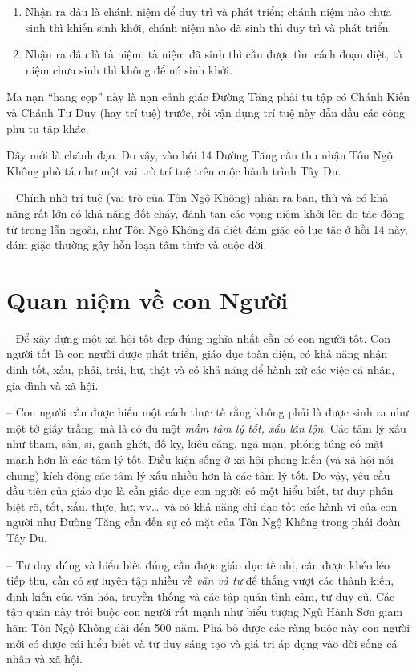 \begin{enumerate}[label=\itshape\arabic*\upshape/]
    \item Nhận ra đâu là chánh niệm để duy trì và phát triển; chánh niệm nào chưa sinh thì khiến sinh khởi, chánh niệm nào đã sinh thì duy trì và phát triển.

    \item Nhận ra đâu là tà niệm; tà niệm đã sinh thì cần được tìm cách đoạn diệt, tà niệm chưa sinh thì không để nó sinh khởi.
\end{enumerate}

Ma nạn ``hang cọp'' này là nạn cảnh giác Đường Tăng phải tu tập có Chánh Kiến và Chánh Tư Duy (hay trí tuệ) trước, rồi vận dụng trí tuệ này dẫn đầu các công phu tu tập khác.

Đây mới là chánh đạo. Do vậy, vào hồi 14 Đường Tăng cần thu nhận Tôn Ngộ Không phò tá như một vai trò trí tuệ trên cuộc hành trình Tây Du.

-- Chính nhờ trí tuệ (vai trò của Tôn Ngộ Không) nhận ra bạn, thù và có khả năng rất lớn có khả năng đốt cháy, đánh tan các vọng niệm khởi lên do tác động từ trong lẫn ngoài, như Tôn Ngộ Không đã diệt đám giặc cỏ lục tặc ở hồi 14 này, đám giặc thường gây hỗn loạn tâm thức và cuộc đời.

\section{Quan niệm về con Người} %
\label{sec:13_con_nguoi}

-- Để xây dựng một xã hội tốt đẹp đúng nghĩa nhất cần có con người tốt. Con người tốt là con người được phát triển, giáo dục toàn diện, có khả năng nhận định tốt, xấu, phải, trái, hư, thật và có khả năng để hành xử các việc cá nhân, gia đình và xã hội.

-- Con người cần được hiểu một cách thực tế rằng không phải là được sinh ra như một tờ giấy trắng, mà là có đủ một \emph{mầm tâm lý tốt, xấu lẫn lộn}. Các tâm lý xấu như tham, sân, si, ganh ghét, đố kỵ, kiêu căng, ngã mạn, phóng túng có mặt mạnh hơn là các tâm lý tốt. Điều kiện sống ở xã hội phong kiến (và xã hội nói chung) kích động các tâm lý xấu nhiều hơn là các tâm lý tốt. Do vậy, yêu cầu đầu tiên của giáo dục là cần giáo dục con người có một hiểu biết, tư duy phân biệt rõ, tốt, xấu, thực, hư, vv\ldots ~và có khả năng chỉ đạo tốt các hành vi của con người như Đường Tăng cần đến sự có mặt của Tôn Ngộ Không trong phải đoàn Tây Du.

-- Tư duy đúng và hiểu biết đúng cần được giáo dục tế nhị, cần được khéo léo tiếp thu, cần có sự luyện tập nhiều về \emph{văn và tư} để thắng vượt các thành kiến, định kiến của văn hóa, truyền thống và các tập quán tình cảm, tư duy cũ. Các tập quán này trói buộc con người rất mạnh như biểu tượng Ngũ Hành Sơn giam hãm Tôn Ngộ Không dài đến 500 năm. Phá bỏ được các ràng buộc này con người mới có được cái hiểu biết và tư duy sáng tạo và giá trị áp dụng vào đời sống cá nhân và xã hội.

